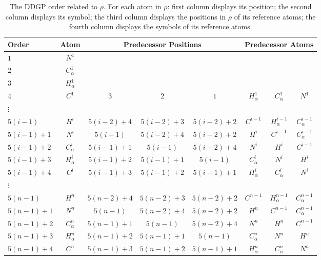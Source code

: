 \documentclass[journal=jacsat,manuscript=article]{achemso}
\begin{document}
\begin{table}[H]
\caption{\normalsize The DDGP order related to $\rho$. {For each atom in $\rho$: first column displays its position; the second column displays its symbol; the third column displays the positions in $\rho$ of its reference atoms; the fourth column displays the symbols of its reference atoms.}}\label{tab:predecessors_rho}
\small
\centering
\begin{tabularx}{\textwidth}{lccccccc} \toprule
    \textbf{Order} & \textbf{Atom} & \multicolumn{3}{c}{\textbf{Predecessor Positions}} & \multicolumn{3}{c}{\textbf{Predecessor Atoms}} \\ \midrule
    $1$ & $N^{1}$ & & & & & \\
    $2$ & $C_{\alpha}^{1}$ & & & & & \\
    $3$ & $H_{\alpha}^{1}$ & & & & & \\
    $4$ & $C^{1}$ & $3$ & $2$ & $1$ & $H_{\alpha}^{1}$ & $C_{\alpha}^{1}$ & $N^{1}$ \\
    $\vdots$ &  &  &  & \\
    $5(i-1)$ & $H^{i}$ & $5(i-2) + 4$ & $5(i-2) + 3$ & $5(i-2) + 2$ & $C^{i-1}$ & $H_{\alpha}^{i-1}$ & $C_{\alpha}^{i-1}$ \\
    $5(i-1) + 1$ & $N^{i}$ & $5(i-1)$ & $5(i-2) + 4$ & $5(i-2) + 2$ & $H^{i}$ & $C^{i-1}$ & $C_{\alpha}^{i-1}$ \\
    $5(i-1) + 2$ & $C_{\alpha}^{i}$ & $5(i-1) + 1$ & $5(i-1)$ & $5(i-2) + 4$ & $N^{i}$ & $H^{i}$ & $C^{i-1}$ \\
    $5(i-1) + 3$ & $H_{\alpha}^{i}$ & $5(i-1) + 2$ & $5(i-1) + 1$ & $5(i-1)$ & $C_{\alpha}^{i}$ & $N^{i}$ & $H^{i}$ \\
    $5(i-1) + 4$ & $C^{i}$ & $5(i-1) + 3$ & $5(i-1) + 2$ & $5(i-1) + 1$ & $H_{\alpha}^{i}$ & $C_{\alpha}^{i}$ & $N^{i}$ \\
    $\vdots$ &  &  &  & \\
    $5(n-1)$ & $H^{n}$ & $5(n-2) + 4$ & $5(n-2) + 3$ & $5(n-2) + 2$ & $C^{n-1}$ & $H_{\alpha}^{n-1}$ & $C_{\alpha}^{n-1}$ \\
    $5(n-1) + 1$ & $N^{n}$ & $5(n-1)$ & $5(n-2) + 4$ & $5(n-2) + 2$ & $H^{n}$ & $C^{n-1}$ & $C_{\alpha}^{n-1}$ \\
    $5(n-1) + 2$ & $C_{\alpha}^{n}$ & $5(n-1) + 1$ & $5(n-1)$ & $5(n-2) + 4$ & $N^{n}$ & $H^{n}$ & $C^{n-1}$ \\
    $5(n-1) + 3$ & $H_{\alpha}^{n}$ & $5(n-1) + 2$ & $5(n-1) + 1$ & $5(n-1)$ & $C_{\alpha}^{n}$ & $N^{n}$ & $H^{n}$ \\
    $5(n-1) + 4$ & $C^{n}$ & $5(n-1) + 3$ & $5(n-1) + 2$ & $5(n-1) + 1$ & $H_{\alpha}^{n}$ & $C_{\alpha}^{n}$ & $N^{n}$ \\ \bottomrule
\end{tabularx} 
\end{table}
\end{document}

